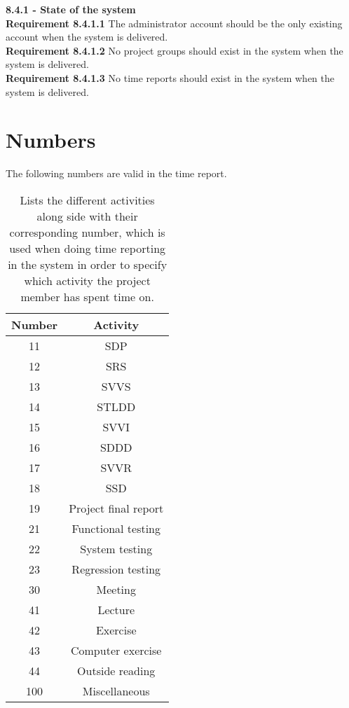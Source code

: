 \documentclass{article}
\begin{document}
{\fontsize{11}{11}\selectfont \noindent\textbf{8.4.1 - State of the system}} \\
\noindent\textbf{Requirement 8.4.1.1} The administrator account should be the only existing account when the system is delivered. \\
\textbf{Requirement 8.4.1.2} No project groups should exist in the system when the system is delivered.\\
\textbf{Requirement 8.4.1.3} No time reports should exist in the system when the system is delivered. \\

\appendix
\section{Numbers} The following numbers are valid in the time report.
\label{numbers}
\begin{table}[htb]
\centering
\begin{tabular}{|c|c|} \hline
    Number        &   Activity    \\ \hline
    11            &   SDP           \\ \hline
    12            &   SRS           \\ \hline
    13            &   SVVS             \\ \hline 
    14            &   STLDD                 \\ \hline
    15            &   SVVI             \\ \hline
    16            &   SDDD                 \\ \hline
    17            &   SVVR                 \\ \hline
    18            &   SSD                 \\ \hline
    19            &   Project final report                 \\ \hline
    21            &   Functional testing               \\ \hline
    22            &   System testing                 \\ \hline
    23            &   Regression testing               \\ \hline
    30            &   Meeting                 \\ \hline
    41            &   Lecture                 \\ \hline
    42            &   Exercise                 \\ \hline
    43            &   Computer exercise                 \\ \hline
    44            &   Outside reading               \\ \hline
    100            &  Miscellaneous                  \\ \hline
\end{tabular}
\caption{Lists the different activities along side with their corresponding number, which is used when doing time reporting in the system in order to specify which activity the project member has spent time on.}
\end{table}
\newpage
\end{document}

